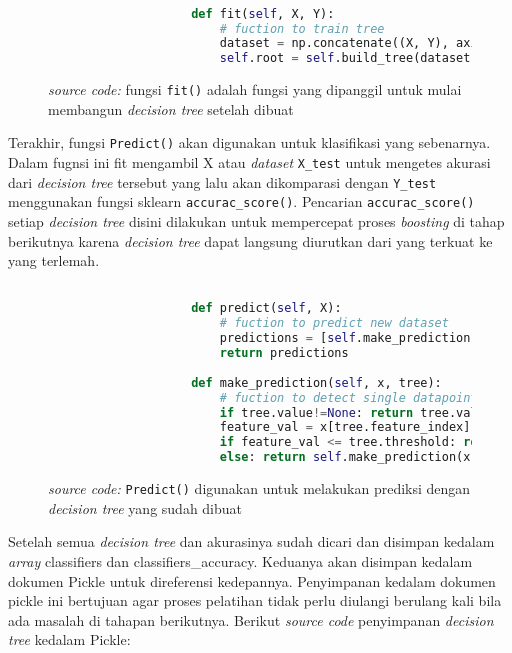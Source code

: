 		\begin{figure}[H]
			\begin{lstlisting}[language=Python, basicstyle=\tiny]

					def fit(self, X, Y):
						# fuction to train tree 
						dataset = np.concatenate((X, Y), axis = 1)
						self.root = self.build_tree(dataset)

			\end{lstlisting}
			\caption{\emph{source code:} fungsi \texttt{fit()} adalah fungsi 
			yang dipanggil untuk mulai membangun \emph{decision tree} setelah dibuat}
			\label{code: fit function}
		\end{figure}

		Terakhir, fungsi \texttt{Predict()} akan digunakan untuk klasifikasi yang sebenarnya. Dalam fugnsi ini 
		fit mengambil X atau \textit{dataset} \texttt{X\_test} untuk mengetes akurasi dari \emph{decision tree} 
		tersebut yang lalu akan dikomparasi dengan \texttt{Y\_test} menggunakan fungsi sklearn \texttt{accurac\_score()}. 
		Pencarian \texttt{accurac\_score()} setiap \emph{decision tree} disini dilakukan untuk 
		mempercepat proses \emph{boosting} di tahap berikutnya karena \emph{decision tree} 
		dapat langsung diurutkan dari yang terkuat ke yang terlemah.

		\begin{figure}[H]
			\begin{lstlisting}[language=Python, basicstyle=\tiny]

					def predict(self, X):
						# fuction to predict new dataset 
						predictions = [self.make_prediction(x, self.root) for x in X]
						return predictions
					
					def make_prediction(self, x, tree):
						# fuction to detect single datapoint
						if tree.value!=None: return tree.value
						feature_val = x[tree.feature_index]
						if feature_val <= tree.threshold: return self.make_prediction(x, tree.left)
						else: return self.make_prediction(x, tree.right)
			\end{lstlisting}
			\caption{\emph{source code:} \texttt{Predict()} digunakan untuk melakukan prediksi 
			dengan \emph{decision tree} yang sudah dibuat}
			\label{code: predict function}
		\end{figure}

		Setelah semua \emph{decision tree} dan akurasinya sudah dicari dan disimpan kedalam 
		\textit{array} classifiers dan classifiers\_accuracy. Keduanya akan disimpan kedalam 
		dokumen Pickle untuk direferensi kedepannya. Penyimpanan kedalam dokumen pickle ini bertujuan 
		agar proses pelatihan tidak perlu diulangi berulang kali bila ada masalah di tahapan berikutnya. 
		Berikut \textit{source code} penyimpanan \emph{decision tree} kedalam Pickle:

